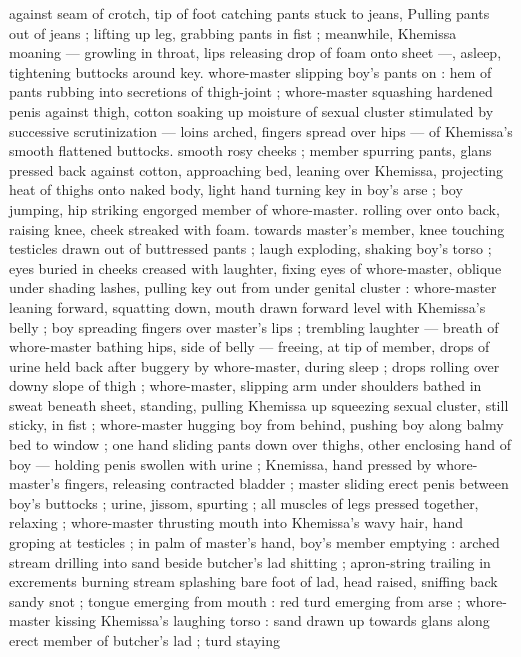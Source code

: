 against seam of crotch, tip of foot catching pants stuck to jeans,
Pulling pants out of jeans ; lifting up leg, grabbing pants in fist ;
meanwhile, Khemissa moaning --- growling in throat, lips releasing
drop of foam onto sheet ---, asleep, tightening buttocks around key.
whore-master slipping boy's pants on : hem of pants rubbing into
secretions of thigh-joint ; whore-master squashing hardened penis
against thigh, cotton soaking up moisture of sexual cluster
stimulated by successive scrutinization --- loins arched, fingers
spread over hips --- of Khemissa's smooth flattened buttocks.
smooth rosy cheeks ; member spurring pants, glans pressed back
against cotton, approaching bed, leaning over Khemissa, projecting
heat of thighs onto naked body, light hand turning key in boy's arse
; boy jumping, hip striking engorged member of whore-master.
rolling over onto back, raising knee, cheek streaked with foam.
towards master's member, knee touching testicles drawn out of
buttressed pants ; laugh exploding, shaking boy’s torso ; eyes buried
in cheeks creased with laughter, fixing eyes of whore-master, oblique
under shading lashes, pulling key out from under genital cluster :
whore-master leaning forward, squatting down, mouth drawn forward
level with Khemissa's belly ; boy spreading fingers over master's lips
; trembling laughter --- breath of whore-master bathing hips, side of
belly --- freeing, at tip of member, drops of urine held back after
buggery by whore-master, during sleep ; drops rolling over downy
slope of thigh ; whore-master, slipping arm under shoulders bathed
in sweat beneath sheet, standing, pulling Khemissa up squeezing
sexual cluster, still sticky, in fist ; whore-master hugging boy from
behind, pushing boy along balmy bed to window ; one hand sliding
pants down over thighs, other enclosing hand of boy --- holding
penis swollen with urine ; Knemissa, hand pressed by whore-master's
fingers, releasing contracted bladder ; master sliding erect penis
between boy's buttocks ; urine, jissom, spurting ; all muscles of legs
pressed together, relaxing ; whore-master thrusting mouth into
Khemissa’s wavy hair, hand groping at testicles ; in palm of master's
hand, boy's member emptying : arched stream drilling into sand
beside butcher's lad shitting ; apron-string trailing in excrements
burning stream splashing bare foot of lad, head raised, sniffing back
sandy snot ; tongue emerging from mouth : red turd emerging from
arse ; whore-master kissing Khemissa’s laughing torso : sand drawn
up towards glans along erect member of butcher's lad ; turd staying
